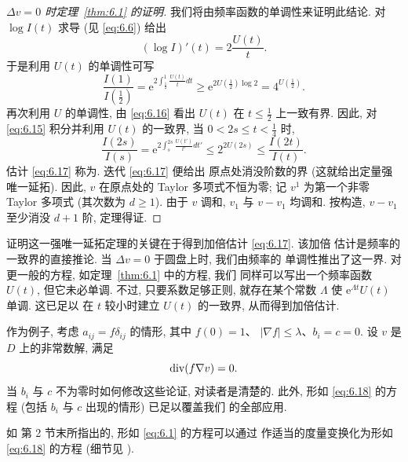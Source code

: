 \begin{proof}[$\Delta v=0$ 时定理~\ref{thm:6.1} 的证明]
我们将由频率函数的单调性来证明此结论. 对 $\log I(t)$ 求导 (见
\eqref{eq:6.6}) 给出
\begin{equation}
(\log I)'(t)=2\frac{U(t)}{t}.
\label{eq:6.15}
\end{equation}
于是利用 $U(t)$ 的单调性可写
\begin{equation}
\frac{I(1)}{I(\frac12)}
=\mathrm{e}^{2\int_{\frac12}^{1}\frac{U(t)}{t}dt}
\geq\mathrm{e}^{2U(\frac12)\log2}=4^{U(\frac12)}.
\label{eq:6.16}
\end{equation}
再次利用 $U$ 的单调性, 由 \eqref{eq:6.16} 看出 $U(t)$ 在
$t\leq\frac12$ 上一致有界. 因此, 对 \eqref{eq:6.15} 积分并利用 $U(t)$
的一致界, 当 $0<2s\leq t<\frac14$ 时,
\begin{equation}
\frac{I(2s)}{I(s)}
=\mathrm{e}^{2\int_s^{2s}\frac{U(t')}{t'}dt'}
\leq2^{2U(2s)}\leq\frac{I(2t)}{I(t)}.
\label{eq:6.17}
\end{equation}
估计 \eqref{eq:6.17} 称为. 迭代 \eqref{eq:6.17} 便给出
原点处消没阶数的界 (这就给出定量强唯一延拓). 因此, $v$ 在原点处的
Taylor 多项式不恒为零; 记 $v^1$ 为第一个非零 Taylor 多项式 (其次数为
$d\geq1$). 由于 $v$ 调和, $v_1$ 与 $v-v_1$ 均调和. 按构造, $v-v_1$
至少消没 $d+1$ 阶, 定理得证.
\end{proof}

证明这一强唯一延拓定理的关键在于得到加倍估计 \eqref{eq:6.17}. 该加倍
估计是频率的一致界的直接推论. 当 $\Delta v=0$ 于圆盘上时, 我们由频率的
单调性推出了这一界. 对更一般的方程, 如定理~\ref{thm:6.1} 中的方程, 我们
同样可以写出一个频率函数 $U(t)$, 但它未必单调. 不过, 只要系数足够正则,
就存在某个常数 $\Lambda$ 使 $\mathrm{e}^{\Lambda t}U(t)$ 单调. 这已足以
在 $t$ 较小时建立 $U(t)$ 的一致界, 从而得到加倍估计.

作为例子, 考虑 $a_{ij}=f\delta_{ij}$ 的情形, 其中 $f(0)=1$、
$|\nabla f|\leq\lambda$、$b_i=c=0$. 设 $v$ 是 $D$ 上的非常数解, 满足
\begin{equation}
\operatorname{div}(f\nabla v)=0.
\label{eq:6.18}
\end{equation}
当 $b_i$ 与 $c$ 不为零时如何修改这些论证, 对读者是清楚的. 此外, 形如
\eqref{eq:6.18} 的方程 (包括 $b_i$ 与 $c$ 出现的情形) 已足以覆盖我们
的全部应用.

\begin{remark}
\label{rem:6.7}
如 \cite{GaLf} 第 2 节末所指出的, 形如 \eqref{eq:6.1} 的方程可以通过
作适当的度量变换化为形如 \eqref{eq:6.18} 的方程 (细节见 \cite{GaLf}).
\end{remark}

